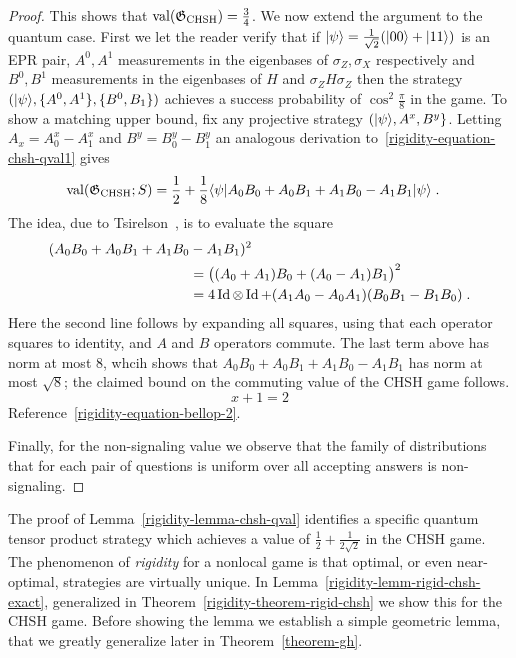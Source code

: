 \begin{proof}
This shows that $\mathrm{val}(\mathfrak{G}_{\mathrm{CHSH}})=\frac{3}{4}$. We now extend the argument to the quantum case. First we let the reader verify that if $|\psi\rangle = \frac{1}{\sqrt{2}} (|00\rangle + |11\rangle)$ is an EPR pair, $A^0, A^1$ measurements in the eigenbases of $\sigma_Z,\sigma_X$ respectively and $B^0,B^1$ measurements in the eigenbases of $H$ and $\sigma_Z H \sigma_Z$ then the strategy $(|\psi\rangle,\{A^0,A^1\},\{B^0,B_1\})$ achieves a success probability of $\cos^2 \frac{\pi}{8}$ in the game. To show a matching upper bound, fix any projective strategy $(|\psi\rangle, A^x,B^y\}$. Letting $A_x = A^x_0-A^x_1$ and  $B^y = B^y_0-B^y_1$ an analogous derivation to~\ref{rigidity-equation-chsh-qval1} gives 
\begin{align*}
\mathrm{val}(\mathfrak{G}_{\mathrm{CHSH}};{S}) &=\frac{1}{2} + \frac{1}{8}\langle\psi| A_0 B_0 + A_0 B_1 + A_1 B_0 - A_1 B_1 |\psi\rangle\;.
\end{align*}
The idea, due to Tsirelson~\cite{cirel1980quantum}, is to evaluate the square
\begin{align}
(A_0 B_0 + A_0 B_1 + A_1 B_0 &- A_1 B_1 )^2\label{equation-bellop}\\
 &=\big( (A_0+A_1) B_0 + (A_0-A_1) B_1 \big)^2\notag\\
&= 4\mathop{\rm Id}\nolimits\otimes \mathop{\rm Id}\nolimits + (A_1A_0-A_0A_1) (B_0B_1-B_1B_0)\;.\notag
\end{align}
Here the second line follows by expanding all squares, using that each operator squares to identity, and $A$ and $B$ operators commute. The last term above has norm at most $8$, whcih shows that $A_0 B_0 + A_0 B_1 + A_1 B_0 - A_1 B_1 $ has norm at most $\sqrt{8}$; the claimed bound on the commuting value of the CHSH game  follows. 
\begin{equation}\label{equation-bellop-2}
x+1=2
\end{equation}
Reference~\ref{rigidity-equation-bellop-2}.

Finally, for the non-signaling value we observe that the family of distributions that for each pair of questions is uniform over all accepting answers is non-signaling. 
\end{proof}


The proof of Lemma~\ref{rigidity-lemma-chsh-qval} identifies a specific quantum tensor product strategy which achieves a value of $\frac{1}{2} + \frac{1}{2\sqrt{2}}$ in the CHSH game. The phenomenon of \emph{rigidity} for a nonlocal game is that optimal, or even near-optimal, strategies are virtually unique. In Lemma~\ref{rigidity-lemm-rigid-chsh-exact}, generalized in Theorem~\ref{rigidity-theorem-rigid-chsh} we show this for the CHSH game. Before showing the lemma we establish a simple geometric lemma, that we greatly generalize later in Theorem~\ref{theorem-gh}. 

